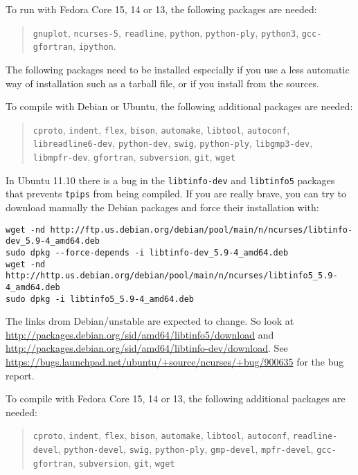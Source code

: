 \documentclass[a4paper]{article}
\begin{document}
To run \Apfa with Fedora Core 15, 14 or 13, the following packages are needed:
\begin{quote}
 \texttt{gnuplot}, \texttt{ncurses-5}, \texttt{readline}, \texttt{python},
  \texttt{python-ply}, \texttt{python3}, \texttt{gcc-gfortran},
  \texttt{ipython}.
\end{quote}

The following packages need to be installed especially if you use a less
automatic way of installation such as a tarball file, or if you install
from the sources.


To compile \Apfa with Debian or Ubuntu, the following additional
packages are needed:
\begin{quote}
  \texttt{cproto}, \texttt{indent}, \texttt{flex}, \texttt{bison},
  \texttt{automake}, \texttt{libtool}, \texttt{autoconf},
  \texttt{libreadline6-dev}, \texttt{python-dev}, \texttt{swig},
  \texttt{python-ply}, \texttt{libgmp3-dev},
  \texttt{libmpfr-dev}, \texttt{gfortran}, \texttt{subversion},
  \texttt{git}, \texttt{wget}
\end{quote}
In Ubuntu 11.10 there is a bug in the \texttt{libtinfo-dev} and
\texttt{libtinfo5} packages that prevents \texttt{tpips} from being
compiled. If you are really brave, you can try to download manually the
Debian packages and force their installation with: {\small
\begin{verbatim}
wget -nd http://ftp.us.debian.org/debian/pool/main/n/ncurses/libtinfo-dev_5.9-4_amd64.deb
sudo dpkg --force-depends -i libtinfo-dev_5.9-4_amd64.deb
wget -nd http://http.us.debian.org/debian/pool/main/n/ncurses/libtinfo5_5.9-4_amd64.deb
sudo dpkg -i libtinfo5_5.9-4_amd64.deb
\end{verbatim}
}%
The links drom Debian/unstable are expected to change. So look at
\url{http://packages.debian.org/sid/amd64/libtinfo5/download} and
\url{http://packages.debian.org/sid/amd64/libtinfo-dev/download}.  See
\url{https://bugs.launchpad.net/ubuntu/+source/ncurses/+bug/900635} for
the bug report.


To compile \Apfa with Fedora Core 15, 14 or 13, the following additional
packages are needed:
\begin{quote}
  \texttt{cproto}, \texttt{indent}, \texttt{flex}, \texttt{bison},
  \texttt{automake}, \texttt{libtool}, \texttt{autoconf},
  \texttt{readline-devel}, \texttt{python-devel}, \texttt{swig},
  \texttt{python-ply}, \texttt{gmp-devel},
  \texttt{mpfr-devel}, \texttt{gcc-gfortran}, \texttt{subversion},
  \texttt{git}, \texttt{wget}
\end{quote}
\end{document}
